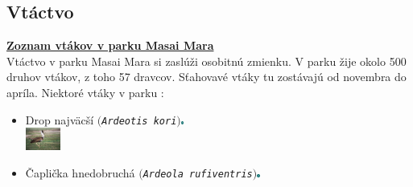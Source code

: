 \documentclass{article}
\begin{document}
	\subsection{Vtáctvo}
\label{subsec:brdng}
\href{https://raw.githubusercontent.com/jenca-adam/masai-mara-birding/master/vtactvo.txt}{\textbf{Zoznam vtákov v parku Masai Mara}}\\ 
Vtáctvo v parku Masai Mara si zaslúži osobitnú zmienku. V parku žije okolo 500 druhov vtákov, z toho 57 dravcov. 
Sťahovavé vtáky tu zostávajú od novembra do apríla.
Niektoré vtáky v parku :\\
\begin{itemize}
\item Drop najväcší $($\texttt{\textit{Ardeotis kori}}$)$\includegraphics[width=0.007\textwidth,natwidth=200,natheight=200]{NT.png}\\
\vskip 2.473927392948942843982cm
\includegraphics[width=0.09\textwidth,natwidth=200,natheight=200]{kori-masai.jpg}\\
\item Čaplička hnedobruchá $($\texttt{\textit{Ardeola rufiventris}}$)$\includegraphics[width=0.007\textwidth,natwidth=200,natheight=200]{LC.png}\\
\vskip 2.473927392948942843982cm


\end{itemize}
\end{document}
